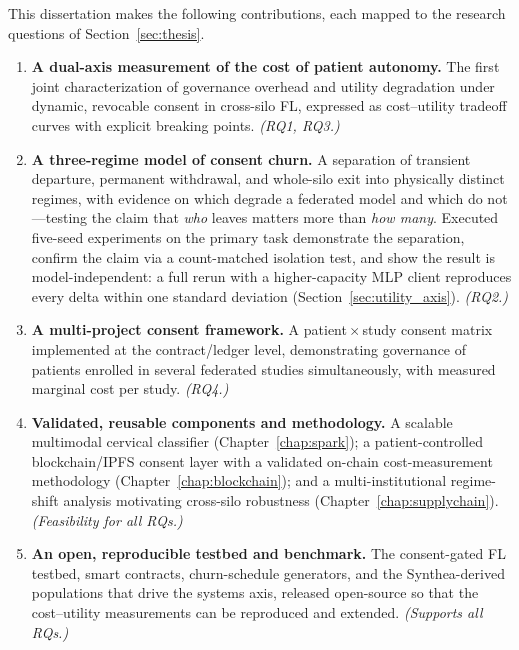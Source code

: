 \documentclass[12pt]{report}
\begin{document}
This dissertation makes the following contributions, each mapped to the research
questions of Section~\ref{sec:thesis}.

\begin{enumerate}[label=\textbf{C\arabic*:}, leftmargin=*, itemsep=0.6em]

\item \textbf{A dual-axis measurement of the cost of patient autonomy.}
The first joint characterization of governance overhead and utility degradation
under dynamic, revocable consent in cross-silo FL, expressed as cost--utility
tradeoff curves with explicit breaking points. \emph{(RQ1, RQ3.)}

\item \textbf{A three-regime model of consent churn.}
A separation of transient departure, permanent withdrawal, and whole-silo exit
into physically distinct regimes, with evidence on which degrade a federated model
and which do not---testing the claim that \emph{who} leaves matters more than
\emph{how many}. Executed five-seed experiments on the primary task demonstrate
the separation, confirm the claim via a count-matched isolation test, and show
the result is model-independent: a full rerun with a higher-capacity MLP client
reproduces every delta within one standard deviation
(Section~\ref{sec:utility_axis}). \emph{(RQ2.)}

\item \textbf{A multi-project consent framework.}
A patient\,$\times$\,study consent matrix implemented at the contract/ledger level,
demonstrating governance of patients enrolled in several federated studies
simultaneously, with measured marginal cost per study. \emph{(RQ4.)}

\item \textbf{Validated, reusable components and methodology.}
A scalable multimodal cervical classifier (Chapter~\ref{chap:spark}); a
patient-controlled blockchain/IPFS consent layer with a validated on-chain
cost-measurement methodology (Chapter~\ref{chap:blockchain}); and a
multi-institutional regime-shift analysis motivating cross-silo robustness
(Chapter~\ref{chap:supplychain}). \emph{(Feasibility for all RQs.)}

\item \textbf{An open, reproducible testbed and benchmark.}
The consent-gated FL testbed, smart contracts, churn-schedule generators, and the
Synthea-derived populations that drive the systems axis, released open-source so
that the cost--utility measurements can be reproduced and extended.
\emph{(Supports all RQs.)}

\end{enumerate}
\end{document}
